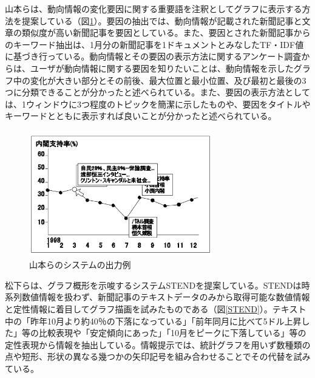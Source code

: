 \documentclass{matsushita-zemi}
\begin{document}
山本らは、動向情報の変化要因に関する重要語を注釈としてグラフに表示する方法を提案している（図\ref{system}）\cite{タグ付きコーパス}。要因の抽出では、動向情報が記載された新聞記事と文章の類似度が高い新聞記事を要因としている。また、要因とされた新聞記事からのキーワード抽出は、1月分の新聞記事を1ドキュメントとみなしたTF・IDF値に基づき行っている。動向情報とその要因の表示方法に関するアンケート調査からは、ユーザが動向情報に関する要因を知りたいことは、動向情報を示したグラフ中の変化が大きい部分とその前後、最大位置と最小位置、及び最初と最後の3つに分類できることが分かったと述べられている。また、要因の表示方法としては、1ウィンドウに3つ程度のトピックを簡潔に示したものや、要因をタイトルやキーワードとともに表示すれば良いことが分かったと述べられている。
\begin{figure}[tb]
  \begin{center}
   \includegraphics[width=8cm,bb=0 0 521 356]{tagu.PNG}
  \end{center}
 \caption{山本らのシステムの出力例}
 \label{system}
\end{figure}

松下らは、グラフ概形を示唆するシステムSTENDを提案している\cite{STEND}。STENDは時系列数値情報を扱わず、新聞記事のテキストデータのみから取得可能な数値情報と定性情報に着目してグラフ描画を試みたものである（図\ref{STEND}）。テキスト中の「昨年10月より約40％の下落になっている」「前年同月に比べて5ドル上昇した」等の比較表現や「安定傾向にあった」「10月をピークに下落している」等の定性表現から情報を抽出している。情報提示では、統計グラフを用いず数種類の点や短形、形状の異なる幾つかの矢印記号を組み合わせることでその代替を試みている。
\end{document}

